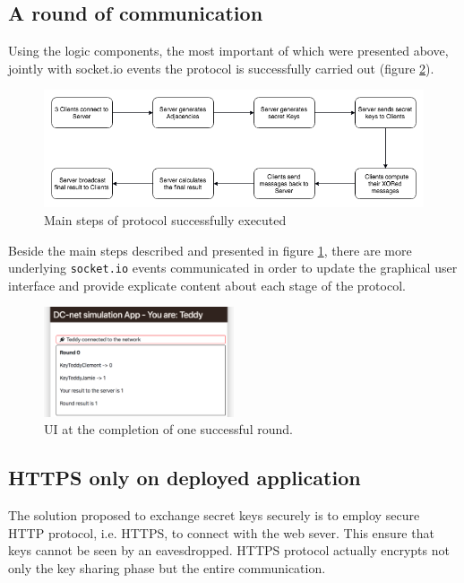 \subsection{A round of communication}
Using the logic components, the most important of which were presented above, jointly with socket.io events the protocol is successfully carried out (figure \ref{fig:singleRoundExecuted}).

\begin{figure}[H]
    \centering
    \includegraphics[width=1\textwidth]{Images/Implementation/protocolExecuted.png}
    \caption{Main steps of protocol successfully executed}
    \label{fig:protocolExecuted}
\end{figure}

Beside the main steps described and presented in figure \ref{fig:protocolExecuted}, there are more underlying \lstinline{socket.io} events communicated in order to update the graphical user interface and provide explicate content about each stage of the protocol.

\begin{figure}[H]
    \centering
    \includegraphics[width=0.5\textwidth]{Images/Implementation/singleRoundExecuted.png}
    \caption{UI at the completion of one successful round.}
    \label{fig:singleRoundExecuted}
\end{figure}


\subsection{HTTPS only on deployed application}
The solution proposed to exchange secret keys securely is to employ secure HTTP protocol, i.e. HTTPS, to connect with the web sever. This ensure that keys cannot be seen by an eavesdropped. HTTPS protocol actually encrypts not only the key sharing phase but the entire communication.

